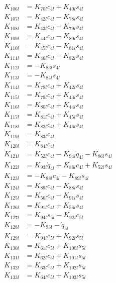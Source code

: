 \begin{multicols}{2}
\begin{align}
K_{106l} &= K_{70l}c_{4l} + K_{40l}s_{4l} \nonumber \\
K_{107l} &= K_{42l}c_{4l} - K_{78l}s_{4l} \nonumber \\
K_{108l} &= K_{43l}c_{4l} - K_{79l}s_{4l} \nonumber \\
K_{109l} &= K_{44l}c_{4l} - K_{80l}s_{4l} \nonumber \\
K_{110l} &= K_{45l}c_{4l} - K_{81l}s_{4l} \nonumber \\
K_{111l} &= K_{46l}c_{4l} - K_{82l}s_{4l} \nonumber \\
K_{112l} &= -K_{83l}s_{4l} \nonumber \\
K_{113l} &= -K_{84l}s_{4l} \nonumber \\
K_{114l} &= K_{78l}c_{4l} + K_{42l}s_{4l} \nonumber \\
K_{115l} &= K_{79l}c_{4l} + K_{43l}s_{4l} \nonumber \\
K_{116l} &= K_{80l}c_{4l} + K_{44l}s_{4l} \nonumber \\
K_{117l} &= K_{81l}c_{4l} + K_{45l}s_{4l} \nonumber \\
K_{118l} &= K_{82l}c_{4l} + K_{46l}s_{4l} \nonumber \\
K_{119l} &= K_{83l}c_{4l} \nonumber \\
K_{120l} &= K_{84l}c_{4l} \nonumber \\
K_{121l} &= K_{52l}c_{4l} - K_{94l}\dot{q}_{4l} - K_{86l}s_{4l} \nonumber \\
K_{122l} &= K_{93l}\dot{q}_{4l} + K_{86l}c_{4l} + K_{52l}s_{4l} \nonumber \\
K_{123l} &= - K_{88l}c_{4l} - K_{89l}s_{4l} \nonumber \\
K_{124l} &= K_{89l}c_{4l} - K_{88l}s_{4l} \nonumber \\
K_{125l} &= K_{56l}c_{4l} - K_{91l}s_{4l} \nonumber \\
K_{126l} &= K_{91l}c_{4l} + K_{56l}s_{4l} \nonumber \\
K_{127l} &= K_{94l}s_{5l} - K_{92l}c_{5l} \nonumber \\
K_{128l} &= - K_{93l} - \dot{q}_{5l} \nonumber \\
K_{129l} &= K_{94l}c_{5l} + K_{92l}s_{5l} \nonumber \\
K_{130l} &= K_{61l}c_{5l} + K_{100l}s_{5l} \nonumber \\
K_{131l} &= K_{62l}c_{5l} + K_{101l}s_{5l} \nonumber \\
K_{132l} &= K_{63l}c_{5l} + K_{102l}s_{5l} \nonumber \\
K_{133l} &= K_{64l}c_{5l} + K_{103l}s_{5l} \nonumber \\

\end{align}
\end{multicols}
